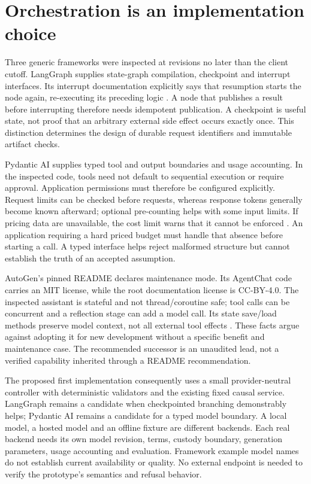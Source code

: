 \section{Orchestration is an implementation choice}

Three generic frameworks were inspected at revisions no later than the client
cutoff. LangGraph supplies state-graph compilation, checkpoint and interrupt
interfaces. Its interrupt documentation explicitly says that resumption starts
the node again, re-executing its preceding logic \cite{v12_la04_langgraph}. A node
that publishes a result before interrupting therefore needs idempotent
publication. A checkpoint is useful state, not proof that an arbitrary external
side effect occurs exactly once. This distinction determines the design of
durable request identifiers and immutable artifact checks.

Pydantic AI supplies typed tool and output boundaries and usage accounting.
In the inspected code, tools need not default to sequential execution or require
approval. Application permissions must therefore be configured explicitly.
Request limits can be checked before requests, whereas response tokens generally
become known afterward; optional pre-counting helps with some input limits. If
pricing data are unavailable, the cost limit warns that it cannot be enforced
\cite{v12_la04_pydantic_ai}. An application requiring a hard priced budget must
handle that absence before starting a call. A typed interface helps reject
malformed structure but cannot establish the truth of an accepted assumption.

AutoGen's pinned README declares maintenance mode. Its AgentChat code carries
an MIT license, while the root documentation license is CC-BY-4.0. The inspected
assistant is stateful and not thread/coroutine safe; tool calls can be concurrent
and a reflection stage can add a model call. Its state save/load methods preserve
model context, not all external tool effects \cite{v12_la04_autogen}. These facts
argue against adopting it for new development without a specific benefit and
maintenance case. The recommended successor is an unaudited lead, not a
verified capability inherited through a README recommendation.

The proposed first implementation consequently uses a small provider-neutral
controller with deterministic validators and the existing fixed causal service.
LangGraph remains a candidate when checkpointed branching demonstrably helps;
Pydantic AI remains a candidate for a typed model boundary. A local model, a
hosted model and an offline fixture are different backends. Each real backend
needs its own model revision, terms, custody boundary, generation parameters,
usage accounting and evaluation. Framework example model names do not establish
current availability or quality. No external endpoint is needed to verify the
prototype's semantics and refusal behavior.

